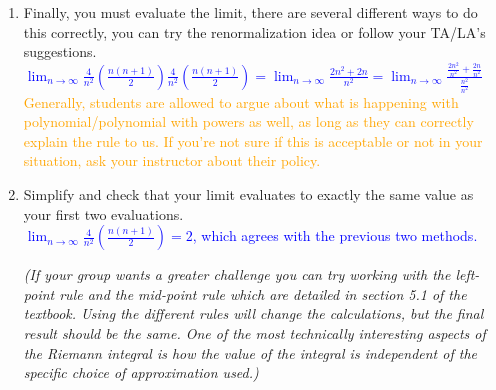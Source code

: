 \documentclass{ximera}
\begin{document}
\begin{exercise}
\begin{enumerate}
        \item Finally, you must evaluate the limit, there are several different ways to do this correctly, you can try the renormalization idea or follow your TA/LA's suggestions.\\
        \textcolor{blue}{$\displaystyle\lim_{n\rightarrow \infty} \frac{4}{n^2}(\frac{n(n+1)}{2})\frac{4}{n^2}(\frac{n(n+1)}{2})=\lim_{n\rightarrow \infty} \frac{2n^2+2n}{n^2}=\lim_{n\rightarrow \infty}\frac{\frac{2n^2}{n^2}+\frac{2n}{n^2}}{\frac{n^2}{n^2}}$}\\
        \textcolor{orange}{Generally, students are allowed to argue about what is happening with polynomial/polynomial with powers as well, as long as they can correctly explain the rule to us.  If you're not sure if this is acceptable or not in your situation, ask your instructor about their policy.}


        \item Simplify and check that your limit evaluates to exactly the same value as your first two evaluations.\\
        \textcolor{blue}{$\displaystyle\lim_{n\rightarrow \infty} \frac{4}{n^2}(\frac{n(n+1)}{2})=2$, which agrees with the previous two methods.}

        \textit{(If your group wants a greater challenge you can try working with the left-point rule and the mid-point rule which are detailed in section 5.1 of the textbook. Using the different rules will change the calculations, but the final result should be the same. One of the most technically interesting aspects of the Riemann integral is how the value of the integral is independent of the specific choice of approximation used.)}
    \end{enumerate}
\end{exercise}
\end{document}
